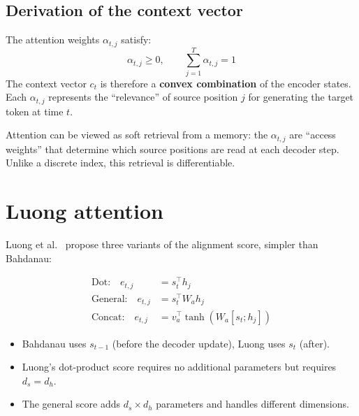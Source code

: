 \subsection{Derivation of the context vector}

\begin{theorem}
The attention weights $\alpha_{t,j}$ satisfy:
\begin{equation}
\alpha_{t,j} \geq 0, \qquad \sum_{j=1}^T \alpha_{t,j} = 1
\end{equation}
The context vector $c_t$ is therefore a \textbf{convex combination} of the
encoder states. Each $\alpha_{t,j}$ represents the ``relevance'' of source
position $j$ for generating the target token at time $t$.
\end{theorem}

\begin{intuition}[title=\textbf{Attention as soft retrieval}]
Attention can be viewed as soft retrieval from a memory: the $\alpha_{t,j}$
are ``access weights'' that determine which source positions are read at each
decoder step. Unlike a discrete index, this retrieval is differentiable.
\end{intuition}

\section{Luong attention}
\label{sec:luong}

Luong et al.\ \cite{luong2015effective} propose three variants of the
alignment score, simpler than Bahdanau:

\begin{keyformulas}[title=\textbf{Luong scores}]
\begin{align}
\text{Dot:} \quad e_{t,j} &= s_t^\top h_j
\label{eq:luong-dot} \\
\text{General:} \quad e_{t,j} &= s_t^\top W_a h_j
\label{eq:luong-general} \\
\text{Concat:} \quad e_{t,j} &= v_a^\top \tanh(W_a [s_t ; h_j])
\label{eq:luong-concat}
\end{align}
\end{keyformulas}

\begin{remark}
\begin{itemize}
  \item Bahdanau uses $s_{t-1}$ (before the decoder update), Luong uses
    $s_t$ (after).
  \item Luong's dot-product score requires no additional parameters but
    requires $d_s = d_h$.
  \item The general score adds $d_s \times d_h$ parameters and handles
    different dimensions.
\end{itemize}
\end{remark}

